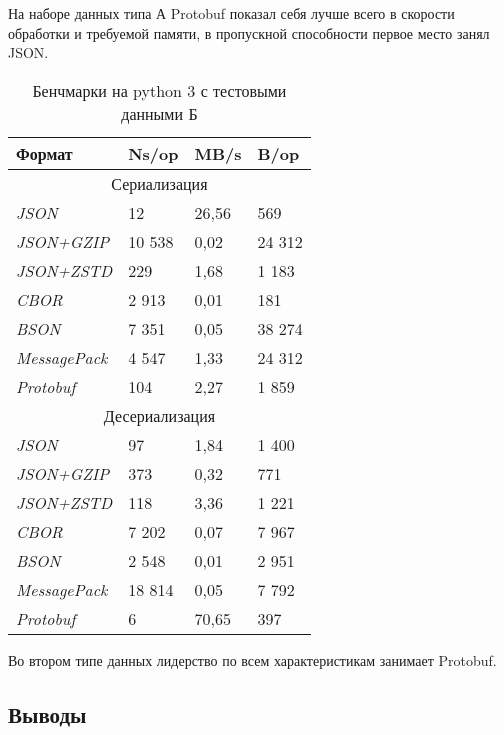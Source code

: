 На наборе данных типа А Protobuf показал себя лучше всего в скорости обработки и требуемой памяти, в пропускной способности первое место занял JSON.  
\clearpage
\begin{table}[ht!]
\centering
\caption{Бенчмарки на python 3 с тестовыми данными Б}
\begin{tabular}{|l|l|l|l|} 
\hline
\textbf{Формат}      & \textbf{Ns/op} & \textbf{MB/s} & \textbf{B/op}  \\ 
\hline
\multicolumn{4}{|c|}{Сериализация}                                        \\ 
\hline
\textit{JSON}        &  12     &    26,56         &  569   \\ 
\hline
\textit{JSON+GZIP}   &  10 538      &  0,02            & 24 312    \\ 
\hline
\textit{JSON+ZSTD}   &  229      &   1,68          &  1 183  \\ 
\hline
\textit{CBOR}        & 2 913    &   0,01    & 181  \\ 
\hline
\textit{BSON}        & 7 351   &   0,05         & 38 274      \\ 
\hline
\textit{MessagePack} & 4 547     &    1,33       & 24 312  \\ 
\hline
\textit{Protobuf}    & 104     &   2,27         & 1 859  \\ 
\hline
\multicolumn{4}{|c|}{Десериализация}                                      \\ 
\hline
\textit{JSON}        &  97     &  1,84     &  1 400  \\ 
\hline
\textit{JSON+GZIP}   & 373  &   0,32       &  771  \\ 
\hline
\textit{JSON+ZSTD}   & 118  &    3,36        &  1 221  \\ 
\hline
\textit{CBOR}        & 7 202    &    0,07         & 7 967  \\ 
\hline
\textit{BSON}        & 2 548     &    0,01       &  2 951  \\ 
\hline
\textit{MessagePack} & 18 814    &    0,05         & 7 792   \\ 
\hline
\textit{Protobuf}    &    6      &     70,65        & 397   \\
\hline
\end{tabular}
\end{table}

Во втором типе данных лидерство по всем характеристикам занимает Protobuf.  
 
\subsection{Выводы}

